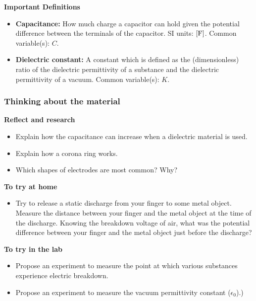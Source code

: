 \begin{framed}
\textbf{Important Definitions}\\
\begin{itemize}
\item \textbf{Capacitance:} How much charge a capacitor can hold given the potential difference between the terminals of the capacitor. SI units: ${\rm \left[{F}\right]}$. Common variable(s): $C$.
\item \textbf{Dielectric constant:} A constant which is defined as the (dimensionless) ratio of the dielectric permittivity of a substance and the dielectric permittivity of a vacuum. Common variable(s): $K$.
\end{itemize}
\end{framed}

\subsubsection{Thinking about the material}

\begin{framed}
\textbf{Reflect and research}\\
\begin{itemize}
\item Explain how the capacitance can increase when a dielectric material is used.
\item Explain how a corona ring works.
\item Which shapes of electrodes are most common? Why?
\end{itemize}
\end{framed}

\begin{framed}
\textbf{To try at home}\\
\begin{itemize}
\item Try to release a static discharge from your finger to some metal object. Measure the distance between your finger and the metal object at the time of the discharge. Knowing the breakdown voltage of air, what was the potential difference between your finger and the metal object just before the discharge?
\end{itemize}
\end{framed}

\begin{framed}
\textbf{To try in the lab}\\
\begin{itemize}
\item Propose an experiment to measure the point at which various substances experience electric breakdown.
\item Propose an experiment to measure the vacuum permittivity constant ($\epsilon_0$).)
\end{itemize}
\end{framed}

